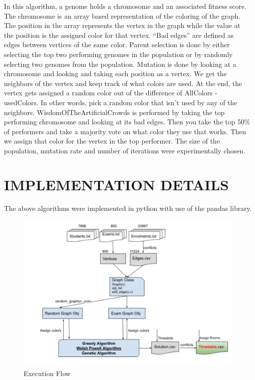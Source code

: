 \documentclass[12]{article}
\begin{document}
In this algorithm, a genome holds a chromosome and an associated fitness score. The chromosome is an array based representation of the coloring of the graph. The position in the array represents the vertex in the graph while the value at the position is the assigned color for that vertex. “Bad edges” are defined as edges between vertices of the same color. Parent selection is done by either selecting the top two performing genomes in the population or by randomly selecting two genomes from the population. Mutation is done by looking at a chromosome and looking and taking each position as a vertex. We get the neighbors of the vertex and keep track of what colors are used. At the end, the vertex gets assigned a random color out of the difference of AllColors - usedColors. In other words, pick a random color that isn’t used by any of the neighbors. WisdomOfTheArtificialCrowds is performed by taking the top performing chromosome and looking at its bad edges. Then you take the top 50$\%$ of performers and take a majority vote on what color they use that works. Then we assign that color for the vertex in the top performer. The size of the population, mutation rate and number of iterations were experimentally chosen.	


\section{IMPLEMENTATION DETAILS}
The above algorithms were implemented in python with use of the pandas library.
\begin{figure}[H]
\centering
        \includegraphics[scale=.35]{imp.png}
    \caption{Execution Flow}
\end{figure}
\end{document}
